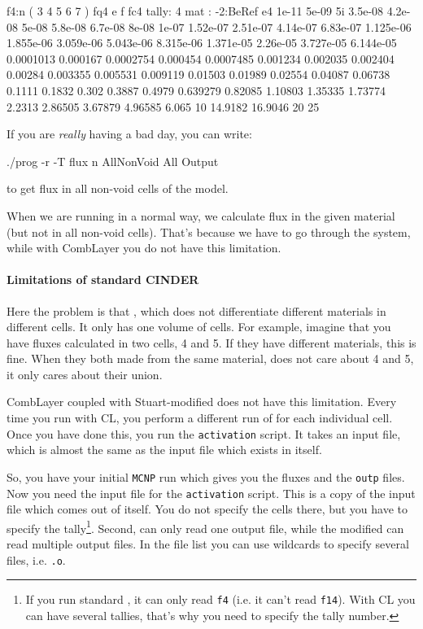 \begin{mcnp}
f4:n ( 3 4 5 6 7 )
fq4   e f
fc4 tally: 4 mat : -2:BeRef
e4    1e-11 5e-09 5i 3.5e-08 4.2e-08 5e-08 5.8e-08 6.7e-08 8e-08 1e-07
        1.52e-07 2.51e-07 4.14e-07 6.83e-07 1.125e-06 1.855e-06
        3.059e-06 5.043e-06 8.315e-06 1.371e-05 2.26e-05 3.727e-05
        6.144e-05 0.0001013 0.000167 0.0002754 0.000454 0.0007485
        0.001234 0.002035 0.002404 0.00284 0.003355 0.005531 0.009119
        0.01503 0.01989 0.02554 0.04087 0.06738 0.1111 0.1832 0.302
        0.3887 0.4979 0.639279 0.82085 1.10803 1.35335 1.73774 2.2313
        2.86505 3.67879 4.96585 6.065 10 14.9182 16.9046 20 25
\end{mcnp}

If you are {\em really} having a bad day, you can write:
\begin{bash}
./prog -r -T flux n AllNonVoid All Output
\end{bash}
to get flux in all non-void cells of the model.

When we are running \cinder in a normal way, we calculate flux in the given material (but not in all non-void cells).
That's because we have to go through the \cinder system, while with CombLayer you do not have this limitation.

\paragraph{Limitations of standard CINDER}
Here the problem is that \cinder, which does not differentiate different materials in different cells.
It only has one volume of cells. For example, imagine that you have fluxes calculated in two cells, 4 and 5.
If they have different materials, this is fine. When they both made from the same material, \cinder does not care about 4 and 5, it only cares about
their union.

CombLayer coupled with Stuart-modified \cinder does not have this limitation. Every time you run \cinder with CL, you perform a different run of \cinder for each individual cell.
Once you have done this, you run the {\tt activation} script. It takes an input file, which is almost the same as the input file which exists in \cinder itself.

So, you have your initial {\tt MCNP} run which gives you the fluxes and the {\tt outp} files. Now you need the input file for the {\tt activation} script.
This is a copy of the input file which comes out of \cinder itself. You do not specify the cells there, but you have to specify the tally\footnote{If you run standard \cinder,
it can only read {\tt f4} (i.e. it can't read {\tt f14}). With CL you can have several tallies, that's why you need to specify the tally number.}.
Second, \cinder can only read one output file, while the modified \cinder can read multiple output files.
In the file list you can use wildcards to specify several files, i.e. {\tt *.o}.


